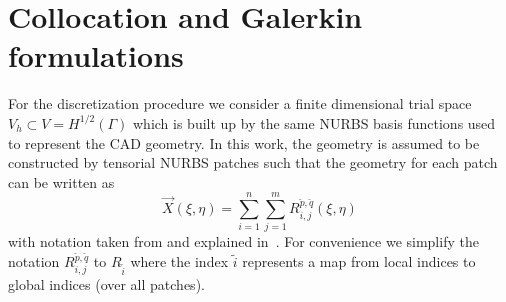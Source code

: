 
\section{Collocation and Galerkin formulations}
\label{Sec3:BEM}
For the discretization procedure we consider a finite dimensional trial space $V_h\subset V=H^{1/2}(\Gamma)$ which is built up by the same NURBS basis functions used to represent the CAD geometry. In this work, the geometry is assumed to be constructed by tensorial NURBS patches such that the geometry for each patch can be written as
\begin{equation*}
	\vec{X}(\xi,\eta) = \sum_{i=1}^n\sum_{j=1}^m R_{i,j}^{\check{p},\check{q}}(\xi,\eta)
\end{equation*}
with notation taken from and explained in~\cite[p. 51]{Cottrell2006iao}. For convenience we simplify the notation $R_{i,j}^{\check{p},\check{q}}$ to $R_{\tilde{i}}$ where the index $\tilde{i}$ represents a map from local indices to global indices (over all patches).

